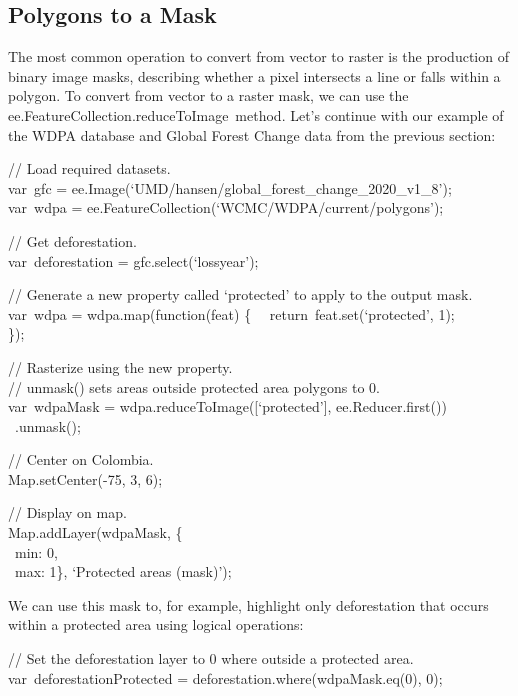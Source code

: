 \documentclass[
  letterpaper,
  DIV=11,
  numbers=noendperiod]{scrreprt}
\begin{document}
\hypertarget{polygons-to-a-mask}{%
\subsection{Polygons to a Mask}\label{polygons-to-a-mask}}

The most common operation to convert from vector to raster is the
production of binary image masks, describing whether a pixel intersects
a line or falls within a polygon. To convert from vector to a raster
mask, we can use the ee.FeatureCollection.reduceToImage~method. Let's
continue with our example of the WDPA database and Global Forest Change
data from the previous section:

// Load required datasets.\\
var~gfc = ee.Image(`UMD/hansen/global\_forest\_change\_2020\_v1\_8');\\
var~wdpa = ee.FeatureCollection(`WCMC/WDPA/current/polygons');

// Get deforestation.\\
var~deforestation = gfc.select(`lossyear');

// Generate a new property called `protected' to apply to the output
mask.\\
var~wdpa = wdpa.map(function(feat) \{~ ~return~feat.set(`protected',
1);\\
\});

// Rasterize using the new property.\\
// unmask() sets areas outside protected area polygons to 0.\\
var~wdpaMask = wdpa.reduceToImage({[}`protected'{]},
ee.Reducer.first())\\
\hspace*{0.333em} ~.unmask();

// Center on Colombia.\\
Map.setCenter(-75, 3, 6);

// Display on map.\\
Map.addLayer(wdpaMask, \{\\
\hspace*{0.333em} ~min: 0,\\
\hspace*{0.333em} ~max: 1\}, `Protected areas (mask)');

We can use this mask to, for example, highlight only deforestation that
occurs within a protected area using logical operations:

// Set the deforestation layer to 0 where outside a protected area.\\
var~deforestationProtected = deforestation.where(wdpaMask.eq(0), 0);
\end{document}
